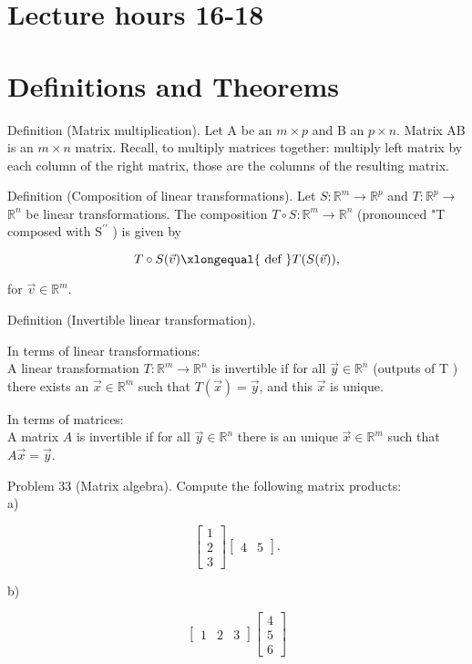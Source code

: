 \documentclass[10pt]{article}
\begin{document}
\section*{Lecture hours 16-18}
\section*{Definitions and Theorems}
Definition (Matrix multiplication). Let A be an $m \times p$ and B an $p \times n$. Matrix AB is an $m \times n$ matrix. Recall, to multiply matrices together: multiply left matrix by each column of the right matrix, those are the columns of the resulting matrix.

Definition (Composition of linear transformations). Let $S: \mathbb{R}^{m} \rightarrow \mathbb{R}^{p}$ and $T: \mathbb{R}^{p} \rightarrow$ $\mathbb{R}^{n}$ be linear transformations. The composition $T \circ S: \mathbb{R}^{m} \rightarrow \mathbb{R}^{n}$ (pronounced "T composed with $\mathrm{S}^{\prime \prime}$ ) is given by

$$
T \circ S(\vec{v}) \xlongequal{\text { def }} T(S(\vec{v})),
$$

for $\vec{v} \in \mathbb{R}^{m}$.

Definition (Invertible linear transformation).

In terms of linear transformations:\\
A linear transformation $T: \mathbb{R}^{m} \rightarrow \mathbb{R}^{n}$ is invertible if for all $\vec{y} \in \mathbb{R}^{n}$ (outputs of T ) there exists an $\vec{x} \in \mathbb{R}^{m}$ such that $T(\vec{x})=\vec{y}$, and this $\vec{x}$ is unique.

In terms of matrices:\\
A matrix $A$ is invertible if for all $\vec{y} \in \mathbb{R}^{n}$ there is an unique $\vec{x} \in \mathbb{R}^{m}$ such that $A \vec{x}=\vec{y}$.

Problem 33 (Matrix algebra). Compute the following matrix products:\\
a)

$$
\left[\begin{array}{l}
1 \\
2 \\
3
\end{array}\right]\left[\begin{array}{ll}
4 & 5
\end{array}\right] .
$$

b)

$$
\left[\begin{array}{lll}
1 & 2 & 3
\end{array}\right]\left[\begin{array}{l}
4 \\
5 \\
6
\end{array}\right]
$$
\end{document}

